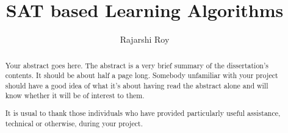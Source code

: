 \documentclass[a4paper, twoside]{report}
\title{SAT based Learning Algorithms}
\author{Rajarshi Roy}
\begin{document}


\begin{abstract}
Your abstract goes here. The abstract is a very brief summary of the dissertation's contents. It should be about half a page long. Somebody unfamiliar with your project should have a good idea of what it's about having read the abstract alone and will know whether it will be of interest to them.
\end{abstract}

\renewcommand{\abstractname}{Acknowledgements}
\begin{abstract}
It is usual to thank those individuals who have provided particularly useful assistance, technical or otherwise, during your project.
\end{abstract}

\tableofcontents
\listoffigures
\listoftables











\end{document}
